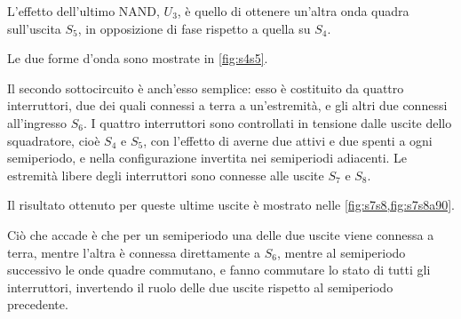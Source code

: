 \documentclass[a4paper,10pt]{article}
\begin{document}
\noindent L'effetto dell'ultimo NAND, $ U_3 $, è quello di ottenere un'altra onda quadra sull'uscita $ S_5 $, in opposizione di fase rispetto a quella su $ S_4 $.

Le due forme d'onda sono mostrate in \cref{fig:s4s5}.
\newline

Il secondo sottocircuito è anch'esso semplice: esso è costituito da quattro interruttori, due dei quali connessi a terra a un'estremità, e gli altri due connessi all'ingresso $ S_6 $.
I quattro interruttori sono controllati in tensione dalle uscite dello squadratore, cioè $ S_4 $ e $ S_5 $, con l'effetto di averne due attivi e due spenti a ogni semiperiodo, e nella configurazione invertita nei semiperiodi adiacenti.
Le estremità libere degli interruttori sono connesse alle uscite $ S_7 $ e $ S_8 $.
\newline

Il risultato ottenuto per queste ultime uscite è mostrato nelle \cref{fig:s7s8,fig:s7s8a90}.

Ciò che accade è che per un semiperiodo una delle due uscite viene connessa a terra, mentre l'altra è connessa direttamente a $ S_6 $, mentre al semiperiodo successivo le onde quadre commutano, e fanno commutare lo stato di tutti gli interruttori, invertendo il ruolo delle due uscite rispetto al semiperiodo precedente.
\end{document}
